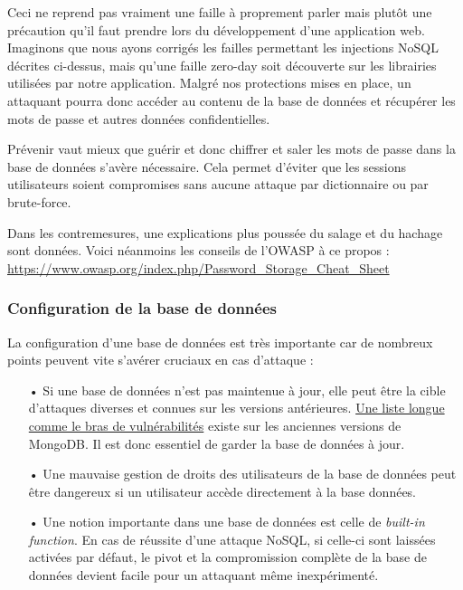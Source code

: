 Ceci ne reprend pas vraiment une faille à proprement parler mais plutôt une précaution qu'il faut prendre lors du développement d'une application web. Imaginons que nous ayons corrigés les failles permettant les injections NoSQL décrites ci-dessus, mais qu'une faille zero-day soit découverte sur les librairies utilisées par notre application. Malgré nos protections mises en place, un attaquant pourra donc accéder au contenu de la base de données et récupérer les mots de passe et autres données confidentielles.

Prévenir vaut mieux que guérir et donc chiffrer et saler les mots de passe dans la base de données s'avère nécessaire. Cela permet d'éviter que les sessions utilisateurs soient compromises sans aucune attaque par dictionnaire ou par brute-force.

Dans les contremesures, une explications plus poussée du salage et du hachage sont données. Voici néanmoins les conseils de l'OWASP à ce propos : \url{https://www.owasp.org/index.php/Password_Storage_Cheat_Sheet}

\subsubsection{Configuration de la base de données}

La configuration d'une base de données est très importante car de nombreux points peuvent vite s'avérer cruciaux en cas d'attaque :

\begin{itemize}
\item[•] Si une base de données n'est pas maintenue à jour, elle peut être la cible d'attaques diverses et connues sur les versions antérieures. \href{https://www.cvedetails.com/vulnerability-list/vendor_id-12752/product_id-25450/Mongodb-Mongodb.html}{Une liste longue comme le bras de vulnérabilités} existe sur les anciennes versions de MongoDB. Il est donc essentiel de garder la base de données à jour.
\item[•] Une mauvaise gestion de droits des utilisateurs de la base de données peut être dangereux si un utilisateur accède directement à la base données.
\item[•] Une notion importante dans une base de données est celle de \emph{built-in function}. En cas de réussite d'une attaque NoSQL, si celle-ci sont laissées activées par défaut, le pivot et la compromission complète de la base de données devient facile pour un attaquant même inexpérimenté.
\end{itemize}

